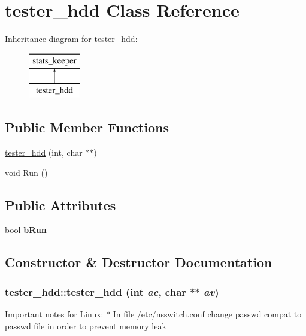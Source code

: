 \hypertarget{classtester__hdd}{
\section{tester\_\-hdd Class Reference}
\label{classtester__hdd}
}
Inheritance diagram for tester\_\-hdd:\begin{figure}[H]
\begin{center}
\leavevmode
\includegraphics[height=2cm]{classtester__hdd}
\end{center}
\end{figure}
\subsection*{Public Member Functions}
\begin{DoxyCompactItemize}
\item 
\hyperlink{classtester__hdd_af43b8ca9595ed8ebf14b2c7cffe561c2}{tester\_\-hdd} (int, char $\ast$$\ast$)
\item 
void \hyperlink{classtester__hdd_abfdcc395e8be504dfd0ea686da790375}{Run} ()
\end{DoxyCompactItemize}
\subsection*{Public Attributes}
\begin{DoxyCompactItemize}
\item 
\hypertarget{classtester__hdd_a71413f3e5b1ecf13efe4eb8c9064a211}{
bool {\bfseries bRun}}
\label{classtester__hdd_a71413f3e5b1ecf13efe4eb8c9064a211}

\end{DoxyCompactItemize}


\subsection{Constructor \& Destructor Documentation}
\hypertarget{classtester__hdd_af43b8ca9595ed8ebf14b2c7cffe561c2}{
\subsubsection[{tester\_\-hdd}]{\setlength{\rightskip}{0pt plus 5cm}tester\_\-hdd::tester\_\-hdd (int {\em ac}, \/  char $\ast$$\ast$ {\em av})}}
\label{classtester__hdd_af43b8ca9595ed8ebf14b2c7cffe561c2}
Important notes for Linux: $\ast$ In file /etc/nsswitch.conf change passwd compat to passwd file in order to prevent memory leak 

